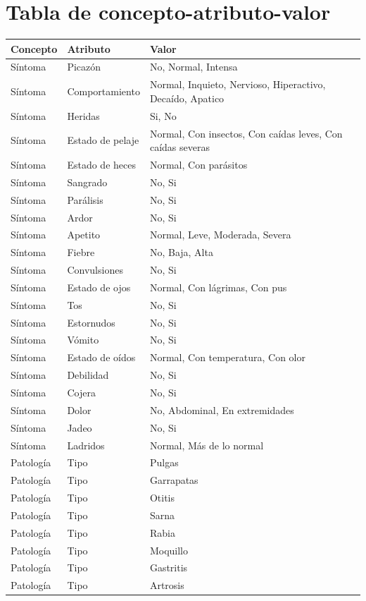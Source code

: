 \documentclass[a4paper,table,xcdraw]{article}
\begin{document}
\section{Tabla de concepto-atributo-valor}
\begin{table}[H]
\centering
\begin{tabular}{|l|l|l|}
\hline
\textbf{Concepto} & \textbf{Atributo} & \textbf{Valor} \\ \hline
Síntoma & Picazón & No, Normal, Intensa \\ \hline
Síntoma & Comportamiento & Normal, Inquieto, Nervioso, Hiperactivo, Decaído, Apatico \\ \hline
Síntoma & Heridas & Si, No \\ \hline
Síntoma & Estado de pelaje & Normal, Con insectos, Con caídas leves, Con caídas severas \\ \hline
Síntoma & Estado de heces & Normal, Con parásitos \\ \hline
Síntoma & Sangrado & No, Si \\ \hline
Síntoma & Parálisis & No, Si \\ \hline
Síntoma & Ardor & No, Si \\ \hline
Síntoma & Apetito & Normal, Leve, Moderada, Severa \\ \hline
Síntoma & Fiebre & No, Baja, Alta \\ \hline
Síntoma & Convulsiones & No, Si \\ \hline
Síntoma & Estado de ojos & Normal, Con lágrimas, Con pus \\ \hline
Síntoma & Tos & No, Si \\ \hline
Síntoma & Estornudos & No, Si \\ \hline
Síntoma & Vómito & No, Si \\ \hline
Síntoma & Estado de oídos & Normal, Con temperatura, Con olor \\
\hline
Síntoma & Debilidad & No, Si \\ \hline
Síntoma & Cojera & No, Si \\ \hline
Síntoma & Dolor & No, Abdominal, En extremidades \\ \hline
Síntoma & Jadeo & No, Si \\ \hline
Síntoma & Ladridos & Normal, Más de lo normal \\ \hline
Patología & Tipo & Pulgas \\ \hline
Patología & Tipo & Garrapatas \\ \hline
Patología & Tipo & Otitis \\ \hline
Patología & Tipo & Sarna \\ \hline
Patología & Tipo & Rabia \\ \hline
Patología & Tipo & Moquillo \\ \hline
Patología & Tipo & Gastritis \\ \hline
Patología & Tipo & Artrosis \\ \hline
\end{tabular}
\end{table}
\end{document}
